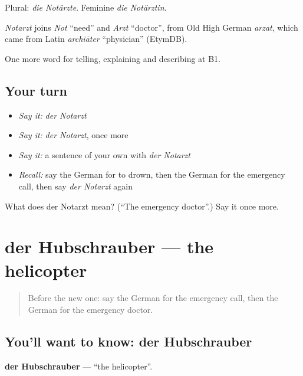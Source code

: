 Plural: \emph{die Notärzte}. Feminine \emph{die Notärztin}.

\begin{cousinweb}
\emph{Notarzt} joins \emph{Not} \textquotedblleft{}need\textquotedblright{} and \emph{Arzt} \textquotedblleft{}doctor\textquotedblright{}, from Old High German \emph{arzat}, which came from Latin \emph{archiāter} \textquotedblleft{}physician\textquotedblright{} (EtymDB).
\end{cousinweb}

\begin{grammarlens}[title={What you've built}]
One more word for telling, explaining and describing at B1.
\end{grammarlens}

\subsection*{Your turn}
\begin{itemize}
\raggedright
  \item \emph{Say it:} \emph{der Notarzt}
  \item \emph{Say it:} \emph{der Notarzt}, once more
  \item \emph{Say it:} a sentence of your own with \emph{der Notarzt}
  \item \emph{Recall:} say the German for to drown, then the German for the emergency call, then say \emph{der Notarzt} again
\end{itemize}

\begin{tcolorbox}[breakable,colback=teal!4,colframe=teal!35!black,title={Before you move on}]
What does der Notarzt mean? (\textquotedblleft{}The emergency doctor\textquotedblright{}.) Say it once more.
\end{tcolorbox}
\section[der Hubschrauber]{der Hubschrauber — the helicopter}

\label{lesson:GE-C291-hubschrauber}



\begin{quote}
Before the new one: say the German for the emergency call, then the German for the emergency doctor.
\end{quote}

\subsection*{You'll want to know: der Hubschrauber}
\textbf{der Hubschrauber} — \textquotedblleft{}the helicopter\textquotedblright{}.

